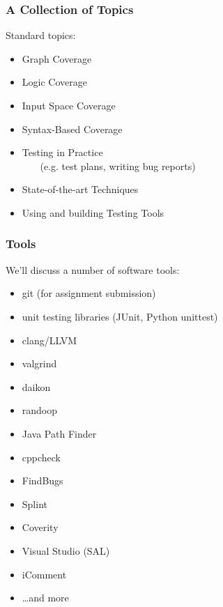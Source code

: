\documentclass{beamer}
\newenvironment{changemargin}[1]{%
  \begin{list}{}{%
    \setlength{\topsep}{0pt}%
    \setlength{\leftmargin}{#1}%
    \setlength{\rightmargin}{1em}
    \setlength{\listparindent}{\parindent}%
    \setlength{\itemindent}{\parindent}%
    \setlength{\parsep}{\parskip}%
  }%
  \item[]}{\end{list}}
\begin{document}
\begin{frame}
\frametitle{A Collection of Topics}

  \begin{changemargin}{2em}
\Large
Standard topics:
\begin{itemize}
\item Graph Coverage
\item Logic Coverage
\item Input Space Coverage
\item Syntax-Based Coverage
\item Testing in Practice\\~~~ (e.g. test plans, writing bug reports)
\item State-of-the-art Techniques
  \item Using and building Testing Tools
\end{itemize}
  \end{changemargin}

\end{frame}

\begin{frame}
\frametitle{Tools}

  \begin{changemargin}{2em}

We'll discuss a number of software tools:

\begin{itemize}
\item git (for assignment submission)
\item unit testing libraries (JUnit, Python unittest)
\item clang/LLVM
\item valgrind
\item daikon
\item randoop
\item Java Path Finder
\item cppcheck
\item FindBugs
\item Splint
\item Coverity
\item Visual Studio (SAL)
\item iComment
  \item \ldots and more
\end{itemize}
  \end{changemargin}

\end{frame}
\end{document}
